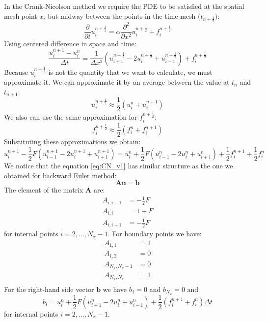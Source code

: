 \documentclass[a4paper,11pt]{article}
\begin{document}
In the Crank-Nicolson method we require the PDE to be satisfied at the spatial
mesh point $x_{i}$ but midway between the points in the time mesh ($t_{n+\frac{1}{2}})$:
\begin{equation}
\frac{\partial}{\partial t} u_{i}^{n+\frac{1}{2}} =
\alpha\frac{\partial^2}{\partial x^2} u_{i}^{n+\frac{1}{2}} + 
f_{i}^{n+\frac{1}{2}}
\end{equation}
%
Using centered difference in space and time:
%
\begin{equation}
\frac{u_{i}^{n+1} - u_{i}^{n}}{\Delta t} = 
\frac{1}{\Delta x^2} \left(
u_{i+1}^{n+\frac{1}{2}} - 2u_{i}^{n+\frac{1}{2}} + u_{i-1}^{n+\frac{1}{2}}
\right) + f_{i}^{n+\frac{1}{2}}
\end{equation}
%
Because $u_{i}^{n+\frac{1}{2}}$ is not the quantity that we want to calculate,
we must approximate it.
We can approximate it by an average between the value at $t_n$ and $t_{n+1}$:
\begin{equation}
u_{i}^{n+\frac{1}{2}} \approx \frac{1}{2}( u_{i}^{n} + u_{i}^{n+1} )
\end{equation}
We also can use the same approximation for $f_{i}^{n+\frac{1}{2}}$:
\begin{equation}
f_{i}^{n+\frac{1}{2}} \approx \frac{1}{2}( f_{i}^{n} + f_{i}^{n+1} )
\end{equation}
%
Substituting these approximations we obtain:
%
\begin{equation}
u_{i}^{n+1} - \frac{1}{2} F \left( u_{i-1}^{n+1} - 2u^{n+1}_{i} + u^{n+1}_{i+1} \right) =
u_{i}^{n} + \frac{1}{2} F \left( u_{i-1}^{n} - 2u^{n}_{i} + u^{n}_{i+1} \right) +
\frac{1}{2} f_{i}^{n+1} + \frac{1}{2} f_{i}^{n}
\label{eq:CN_v1}
\end{equation}
%
We notice that the equation \eqref{eq:CN_v1} has similar structure as the one we obtained
for backward Euler method:
%
\begin{equation}
\mathbf{A}\mathbf{u} = \mathbf{b}
\end{equation}
%
The element of the matrix $\mathbf{A}$ are:
%
\begin{align*}
A_{i,i-1} & = -\frac{1}{2}F \\
A_{i,i}   & = 1 + F \\
A_{i,i+1} & = -\frac{1}{2}F
\end{align*}
%
for internal points $i = 2,\ldots,N_{x}-1$. For boundary points we have:
%
\begin{align*}
A_{1,1} & = 1 \\
A_{1,2} & = 0 \\
A_{N_{x},N_{x}-1} & = 0 \\
A_{N_{x},N_{x}} & = 1 \\
\end{align*}
%
For the right-hand side vector $\mathbf{b}$ we have $b_{1} = 0$ and $b_{N_x} = 0$ and
\begin{equation}
b_{i} = u^{n}_{i} + \frac{1}{2}F \left( u^{n}_{i+1} -2u^{n}_{i} + u^{n}_{i-1} \right) +
\frac{1}{2} \left( f_{i}^{n+1} + f_{i}^{n} \right) \Delta t
\end{equation}
for internal points $i = 2, \ldots, N_{x}-1$.
\end{document}
